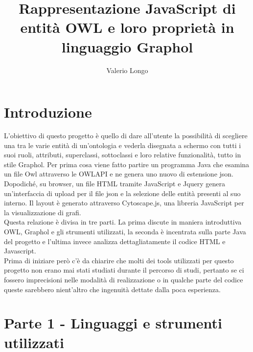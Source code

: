 \documentclass[Lau,binding=0.6cm]{sapthesis}
\title{Rappresentazione JavaScript di entità OWL e loro proprietà in linguaggio Graphol}
\author{Valerio Longo}
\begin{document}
\frontmatter

\maketitle


\tableofcontents

\frontmatter
\chapter{Introduzione} L'obiettivo di questo progetto è quello di dare all'utente la possibilità di scegliere una tra le varie entità di un'ontologia e vederla disegnata a schermo con tutti i suoi ruoli, attributi, superclassi, sottoclassi e loro relative funzionalità, tutto in stile Graphol. Per prima cosa viene fatto partire un programma Java che esamina un file Owl attraverso le OWLAPI e ne genera uno nuovo di estensione json. Dopodiché, su browser, un file HTML tramite JavaScript e Jquery genera un'interfaccia di upload per il file  json e la selezione delle entità presenti al suo interno. Il layout è generato attraverso Cytoscape.js, una libreria JavaScript per la visualizzazione di grafi.\\ Questa relazione è divisa in tre parti. La prima discute in maniera introduttiva OWL, Graphol e gli strumenti utilizzati, la seconda è incentrata sulla parte Java del progetto e l'ultima invece analizza dettagliatamente il codice HTML e Javascript.
\\Prima di iniziare però c'è da chiarire che molti dei tools utilizzati per questo progetto non erano mai stati studiati durante il percorso di studi, pertanto se ci fossero imprecisioni nelle modalità di realizzazione o in qualche parte del codice queste sarebbero nient'altro che ingenuità dettate dalla poca esperienza.
\mainmatter


\chapter{Parte 1 - Linguaggi e strumenti utilizzati}
\end{document}
